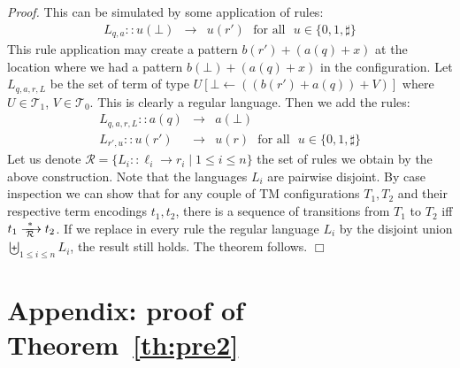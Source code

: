 \documentclass[a4paper]{article}
\theoremstyle{plain}
\newcommand{\qed}{\hfill $\Box$}
\newenvironment{proof}{\noindent\emph{Proof.}}{}
\newcommand{\R}{\mathcal{R}}
\newcommand{\T}{\mathcal{T}}
\def\frew#1#2#3#4#5#6#7#8{
\setbox0=\hbox{$#6 #7 #1 #8$}\setbox1=\hbox{$#6 #7 #2 #8$}\ifdim \wd0>\wd1 \rlap{\rlap{\hbox to \wd0{#5}}{\hbox to\wd0{\hfil\lower #3\box1\relax\hfil}}}{\raise #4\box0}\else \rlap{\rlap{\hbox to \wd1{#5}}{\hbox to\wd1{\hfil\raise #4\box0\relax\hfil}}}{\lower #3\box1}\fi
}
\def\fstep#1#2#3#4#5{\mathchoice{\frew{#1}{#2}{1.10ex}{1.20ex}{#5}{\scriptstyle}{#3}{#4}}{\frew{#1}{#2}{0.82ex}{1.20ex}{#5}{\scriptstyle}{#3}{#4}}{\frew{#1}{#2}{0.51ex}{0.82ex}{#5}{\scriptscriptstyle}{#3}{#4}}{\frew{#1}{#2}{0.51ex}{0.69ex}{#5}{\scriptscriptstyle}{#3}{#4}}}
\newcommand{\lrstep}[2]{\mathrel{\fstep{#1}{#2}{\;\>}{\>\>\;}{\rightarrowfill}}}
\begin{document}
\begin{proof}
This can be simulated by some  application of rules:
\begin{eqnarray}
L_{q,a}  :: u(\bot)     &\rightarrow& u(r')  \mbox{ ~for all ~}  u \in \{0,1,\sharp\}
\end{eqnarray}
This rule application may create a pattern $b(r') + (a(q)+ x)$  at the location where we had a pattern 
$b(\bot) + (a(q)+ x)$ in the configuration. 
Let $L_{q,a,r,L}$ be the set of term of type $U[\bot \leftarrow ((b(r')+ a(q)) +V)]$ where $U\in \T_1$, 
$V \in \T_0$.
This is clearly a regular language. Then we add the rules: 
\begin{eqnarray}
 L_{q,a,r,L} :: a(q) &\rightarrow &a(\bot) \\
 L_{r',u} :: u(r')   &\rightarrow & u(r) \mbox{ ~for all ~}  u \in \{0,1,\sharp\} 
\end{eqnarray}
Let us denote $
\R = \{ L_i::\ell_i \rightarrow r_i \mid 1 \leq i \leq n \}$ 
the set of rules we obtain by the above construction.
Note that the languages $L_i$ are pairwise disjoint. 
By case inspection we can show that for any couple of TM configurations $T_1, T_2$
and their respective term encodings $t_1, t_2$, there is a sequence of transitions from 
$T_1$ to $T_2$ iff $t_1 \lrstep{*}{\R} t_2$. 
If we replace in every rule the regular language $L_i$  
by the disjoint union  $\biguplus_{1 \leq i \leq n} L_i$, the result still holds.
The theorem follows. 
\qed
\end{proof}
\begin{comment}
Let us denote 
$\{ L_i::\ell_i \rightarrow r_i ~|~1 \leq i \leq n \}$ the set of rules we obtain by the above construction.
Since the  $L_i$ are pairwise disjoint  we can replace in every  rule the  regular language $L_i$  
by the disjoint union  $\cup_{\{1 \leq i \leq n \}} L_i$. With these new rules it should be still possible to show that for any couple of TM configurations $T_1, T_2$
and their respective term encodings $t_1, t_2$, there is a a sequence of transitions from 
$T_1$ to $T_2$ iff there $t_1 \to^*  t_2$ and therefore gets  undecidability 
result for uniform PGTRS. 
\end{comment}






\section{Appendix: proof of Theorem~\protect\ref{th:pre2}}
\end{document}
